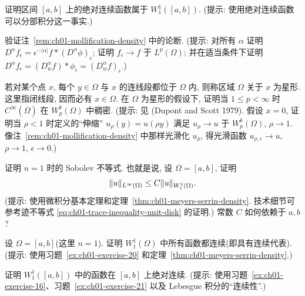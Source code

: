 \begin{MBExercise}
\label{ex:ch01-exercise-17}
证明区间 $[a,b]$ 上的绝对连续函数属于 $W_1^1([a,b])$. (提示: 使用绝对连续函数可以分部积分这一事实.)
\end{MBExercise}

\begin{MBExercise}
\label{ex:ch01-exercise-18}
验证注~\ref{rem:ch01-mollification-density} 中的论断. (提示: 对所有 $\alpha$ 证明 $D^\alpha f_\epsilon=\epsilon^{-|\alpha|}f*(D^\alpha\phi)_\epsilon$; 证明 $f_\epsilon\to f$ 于 $L^p(\Omega)$; 并在适当条件下证明 $D^\alpha f_\epsilon=(D_w^\alpha f)*\phi_\epsilon=(D_w^\alpha f)_\epsilon$.)
\end{MBExercise}

\begin{MBExercise}
\label{ex:ch01-exercise-19}
若对某个点 $x$, 每个 $y\in\Omega$ 与 $x$ 的连线段都位于 $\Omega$ 内, 则称区域 $\Omega$ 关于 $x$ 为星形. 这里指闭线段, 因而必有 $x\in\Omega$. 在 $\Omega$ 为星形的假设下, 证明当 $1\leq p<\infty$ 时 $C^\infty(\overline\Omega)$ 在 $W_p^k(\Omega)$ 中稠密. (提示: 见 (Dupont and Scott 1979). 假设 $x=0$, 证明当 $\rho<1$ 时定义的``伸缩'' $u_\rho(y)=u(\rho y)$ 满足 $u_\rho\to u$ 于 $W_p^k(\Omega)$, $\rho\to1$. 像注~\ref{rem:ch01-mollification-density} 中那样光滑化 $u_\rho$, 得光滑函数 $u_{\rho,\epsilon}\to u$, $\rho\to1$, $\epsilon\to0$.)
\end{MBExercise}

\begin{MBExercise}
\label{ex:ch01-exercise-20}
证明 $n=1$ 时的 Sobolev 不等式. 也就是说, 设 $\Omega=[a,b]$, 证明
\[
\MathBookFormulaID{formula-ch01-exercise-20-one-dimensional-sobolev}
\|u\|_{L^\infty(\Omega)}\leq C\|u\|_{W_1^1(\Omega)}.
\]
(提示: 使用微积分基本定理和定理~\ref{thm:ch01-meyers-serrin-density}. 技术细节可参考迹不等式 \eqref{eq:ch01-trace-inequality-unit-disk} 的证明.) 常数 $C$ 如何依赖于 $a,b$?
\end{MBExercise}

\begin{MBExercise}
\label{ex:ch01-exercise-21}
设 $\Omega=[a,b]$(这里 $n=1$). 证明 $W_1^1(\Omega)$ 中所有函数都连续(即具有连续代表). (提示: 使用习题~\ref{ex:ch01-exercise-20} 和定理~\ref{thm:ch01-meyers-serrin-density}.)
\end{MBExercise}

\begin{MBExercise}
\label{ex:ch01-exercise-22}
证明 $W_1^1([a,b])$ 中的函数在 $[a,b]$ 上绝对连续. (提示: 使用习题~\ref{ex:ch01-exercise-16}、习题~\ref{ex:ch01-exercise-21} 以及 Lebesgue 积分的``连续性''.)
\end{MBExercise}

